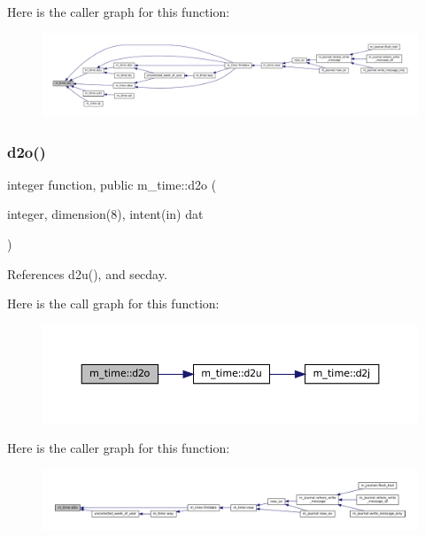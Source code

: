 Here is the caller graph for this function\+:\nopagebreak
\begin{figure}[H]
\begin{center}
\leavevmode
\includegraphics[width=350pt]{namespacem__time_a12cbfe4ebed008f4cdf88df4358df8ad_icgraph}
\end{center}
\end{figure}
\mbox{\label{namespacem__time_a727dd77bbd4a5d0e3947c5d303845947}} 
\subsubsection{\texorpdfstring{d2o()}{d2o()}}
{\footnotesize\ttfamily integer function, public m\+\_\+time\+::d2o (\begin{DoxyParamCaption}\item[{integer, dimension(8), intent(in)}]{dat }\end{DoxyParamCaption})}



References d2u(), and secday.

Here is the call graph for this function\+:\nopagebreak
\begin{figure}[H]
\begin{center}
\leavevmode
\includegraphics[width=350pt]{namespacem__time_a727dd77bbd4a5d0e3947c5d303845947_cgraph}
\end{center}
\end{figure}
Here is the caller graph for this function\+:\nopagebreak
\begin{figure}[H]
\begin{center}
\leavevmode
\includegraphics[width=350pt]{namespacem__time_a727dd77bbd4a5d0e3947c5d303845947_icgraph}
\end{center}
\end{figure}
\mbox{\label{namespacem__time_ac4bd98688e1277ab6cfc16697331406c}} 
